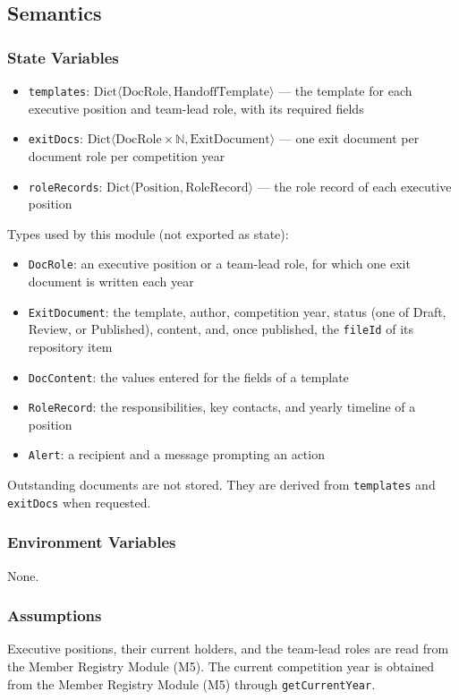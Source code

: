 \documentclass[12pt, titlepage]{article}
\begin{document}
\subsection{Semantics}

\subsubsection{State Variables}
\begin{itemize}
  \item \texttt{templates}: $\text{Dict}\langle \text{DocRole}, \text{HandoffTemplate} \rangle$ --- the template for each executive position and team-lead role, with its required fields
  \item \texttt{exitDocs}: $\text{Dict}\langle \text{DocRole} \times \mathbb{N}, \text{ExitDocument} \rangle$ --- one exit document per document role per competition year
  \item \texttt{roleRecords}: $\text{Dict}\langle \text{Position}, \text{RoleRecord} \rangle$ --- the role record of each executive position
\end{itemize}

Types used by this module (not exported as state):
\begin{itemize}
  \item \texttt{DocRole}: an executive position or a team-lead role, for which one exit document is written each year
  \item \texttt{ExitDocument}: the template, author, competition year, status (one of Draft, Review, or Published), content, and, once published, the \texttt{fileId} of its repository item
  \item \texttt{DocContent}: the values entered for the fields of a template
  \item \texttt{RoleRecord}: the responsibilities, key contacts, and yearly timeline of a position
  \item \texttt{Alert}: a recipient and a message prompting an action
\end{itemize}

Outstanding documents are not stored. They are derived from \texttt{templates} and \texttt{exitDocs} when requested.

\subsubsection{Environment Variables}
None.

\subsubsection{Assumptions}
Executive positions, their current holders, and the team-lead roles are read from the Member Registry Module (M5). The current competition year is obtained from the Member Registry Module (M5) through \texttt{getCurrentYear}.
\end{document}
